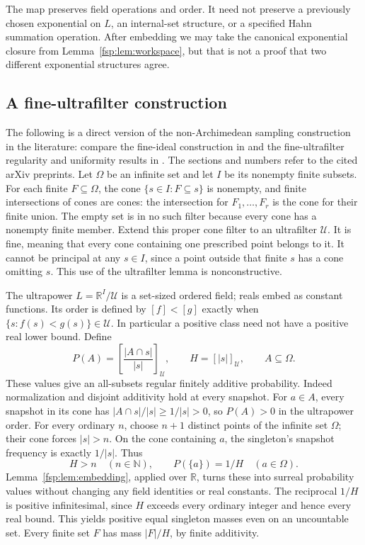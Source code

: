 \documentclass[11pt,a4paper]{article}
\numberwithin{equation}{section}
\theoremstyle{definition}
\theoremstyle{remark}
\newcommand{\R}{\mathbb R}
\newcommand{\N}{\mathbb N}
\begin{document}
The map preserves field operations and order. It need not preserve a
previously chosen exponential on $L$, an internal-set structure, or a
specified Hahn summation operation. After embedding we may take the
canonical exponential closure from Lemma~\ref{fsp:lem:workspace}, but that
is not a proof that two different exponential structures agree.

\subsection{A fine-ultrafilter construction}\label{fsp:sub:ultrafilter}

The following is a direct version of the non-Archimedean sampling
construction in the literature: compare the fine-ideal construction
in \cite[Section~4.2]{bhw} and the fine-ultrafilter regularity and
uniformity results in \cite[Definition~4 and Propositions~5--6]{brickhill}.
The sections and numbers refer to the cited arXiv preprints. Let $\Omega$ be
an infinite set and let $I$ be its nonempty finite subsets. For each
finite $F\subseteq\Omega$, the cone
$\{s\in I:F\subseteq s\}$ is nonempty, and finite intersections of
cones are cones: the intersection for $F_1,\ldots,F_r$ is the cone
for their finite union. The empty set is in no such filter because every
cone has a nonempty finite member. Extend this proper cone filter to an
ultrafilter $\mathcal U$. It is fine, meaning that every cone containing
one prescribed point belongs to it. It cannot be principal at any
$s\in I$, since a point outside that finite $s$ has a cone omitting $s$.
This use of the ultrafilter lemma is nonconstructive.

The ultrapower $L=\R^I/\mathcal U$ is a set-sized ordered field;
reals embed as constant functions. Its order is defined by
$[f]<[g]$ exactly when $\{s:f(s)<g(s)\}\in\mathcal U$.
In particular a positive class need not have a positive real lower bound.
Define
\begin{equation}\label{fsp:eq:ultrafilter}
 P(A)=\left[\frac{|A\cap s|}{|s|}\right]_{\mathcal U},\qquad
 H=[|s|]_{\mathcal U},\qquad A\subseteq\Omega.
\end{equation}
These values give an all-subsets regular finitely additive probability.
Indeed normalization and disjoint additivity hold at every snapshot.
For $a\in A$, every snapshot in its cone has
$|A\cap s|/|s|\ge1/|s|>0$, so $P(A)>0$ in the ultrapower order.
For every ordinary $n$, choose $n+1$ distinct points of the infinite
set $\Omega$; their cone forces $|s|>n$. On the cone containing $a$,
the singleton's snapshot frequency is exactly $1/|s|$. Thus
\begin{equation}
 H>n\quad(n\in\N),\qquad P(\{a\})=1/H
 \quad(a\in\Omega).
\end{equation}
Lemma~\ref{fsp:lem:embedding}, applied over $\R$, turns these into surreal
probability values without changing any field identities or real constants.
The reciprocal $1/H$ is positive infinitesimal, since $H$ exceeds every
ordinary integer and hence every real bound. This yields positive equal
singleton masses even on an uncountable set. Every finite set $F$ has
mass $|F|/H$, by finite additivity.
\end{document}
